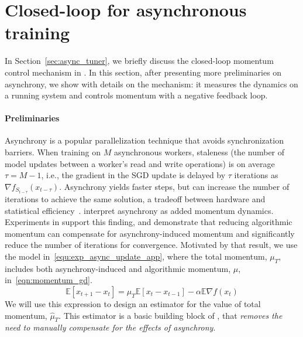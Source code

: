 \section{Closed-loop \tuner for asynchronous training}
\label{sec:async_app}
In Section~\ref{sec:async_tuner}, we briefly discuss the closed-loop momentum control mechanism in \asynctuner. In this section, after presenting more preliminaries on asynchrony, we show with details on the mechanism: 
it measures the dynamics on a running system and controls momentum with a negative feedback loop.
\paragraph{Preliminaries}
Asynchrony is a popular parallelization technique \citep{recht2011hogwild} that avoids synchronization barriers.
When training on $M$ asynchronous workers, staleness (the number of model updates between a worker's read and write operations) is on average $\tau=M-1$,
i.e., the gradient in the SGD update is delayed by $\tau$ iterations as $\nabla f_{S_{t - \tau}}(x_{t - \tau} )$.
Asynchrony yields faster steps, but can
increase the number of iterations to achieve the same solution,
a tradeoff between hardware and statistical 
efficiency~\citep{DBLP:journals/pvldb/ZhangR14}.
\citet{mitliagkas2016asynchrony} interpret asynchrony as added momentum dynamics.
Experiments in \citet{hadjis2016omnivore} support this finding, and demonstrate that reducing algorithmic momentum can compensate for asynchrony-induced momentum
and significantly reduce the number of iterations for convergence.
Motivated by that result, we use the model
in~\eqref{equ:exp_async_update_app}, where the total momentum, $\mu_T$, includes both asynchrony-induced and algorithmic  momentum, $\mu$, in~\eqref{eqn:momentum_gd}.
\begin{equation}
	\mathbb{E}[ x_{t+1} - x_t ] 
	= \mu_T \mathbb{E}[x_t - x_{t-1}] - \alpha \mathbb{E}\nabla f(x_{t})
\label{equ:exp_async_update_app}
\end{equation}
We will use this expression to design an estimator for the value of total momentum, $\hat{\mu}_T$.
This estimator is a basic building block of \asynctuner, that {\em removes the need to manually compensate for the effects of asynchrony}.



